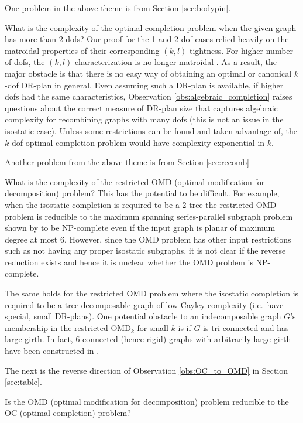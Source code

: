 One problem in the above theme is from Section \ref{sec:bodypin}.
\begin{openproblem}
    What is the complexity of the optimal completion problem when the given graph has more than 2-dofs? Our proof for the 1 and 2-dof cases relied heavily on the matroidal properties of their corresponding $(k,l)$-tightness. For higher number of dofs, the $(k,l)$ characterization is no longer matroidal \cite{Lee:2007:PGA}. As a result, the major obstacle is that there is no easy way of obtaining an optimal or canonical $k$-dof DR-plan in general. Even assuming such  a DR-plan is available, if higher dofs had the same characteristics, Observation \ref{obs:algebraic_completion} raises questions about the correct measure of DR-plan size that captures algebraic complexity for recombining graphs with many dofs (this is not an issue in the isostatic case). Unless some restrictions can be found and taken advantage of, the $k$-dof optimal completion problem would  have complexity exponential in $k$.
\end{openproblem}

Another problem from the above theme is from Section \ref{sec:recomb}
\begin{openproblem}
    What is the complexity of the restricted OMD (optimal modification for decomposition) problem? This has the potential to be difficult. For example, when the isostatic completion is required to be a 2-tree the restricted OMD problem is reducible to the maximum spanning series-parallel subgraph problem shown by \cite{cai1993spanning} to be NP-complete even if the input graph is planar of maximum degree at most 6. However, since the OMD problem has other input restrictions such as not having any proper isostatic subgraphs, it is not clear if the reverse reduction exists and hence it is unclear whether the OMD problem is NP-complete.

    The same holds for the restricted OMD problem where the isostatic completion is required to be a tree-decomposable graph of low Cayley complexity (i.e.\ have special, small DR-plans). One potential obstacle to an indecomposable graph $G$'s membership in the restricted OMD$_k$ for small $k$ is if $G$ is tri-connected and has large girth. In fact, 6-connected (hence rigid) graphs with arbitrarily large girth have been constructed in \cite{servatius2000rigidity}.
\end{openproblem}

The next is the reverse direction of Observation \ref{obs:OC_to_OMD} in Section \ref{sec:table}.
\begin{openproblem}
    Is the OMD (optimal modification for decomposition) problem reducible to the OC (optimal completion) problem?
\end{openproblem}


